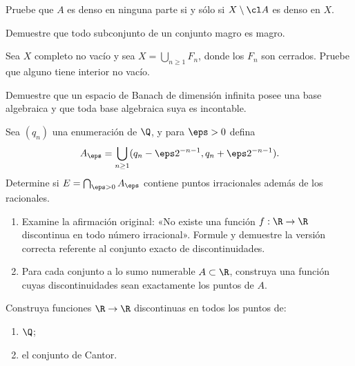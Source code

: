 \begin{ejercicio}\label{ej:lectura-10-4}
Pruebe que $A$ es denso en ninguna parte si y sólo si $X\setminus\cl A$ es denso en $X$.
\end{ejercicio}


\begin{ejercicio}\label{ej:lectura-10-5}
Demuestre que todo subconjunto de un conjunto magro es magro.
\end{ejercicio}


\begin{ejercicio}\label{ej:lectura-10-6}
Sea $X$ completo no vacío y sea $X=\bigcup_{n\geq1}F_n$, donde los $F_n$ son cerrados. Pruebe que alguno tiene interior no vacío.
\end{ejercicio}


\begin{ejercicio}\label{ej:lectura-10-7}
Demuestre que un espacio de Banach de dimensión infinita posee una base algebraica y que toda base algebraica suya es incontable.
\end{ejercicio}


\begin{ejercicio}\label{ej:lectura-10-8}
Sea $(q_n)$ una enumeración de $\Q$, y para $\eps>0$ defina
\[
 A_\eps=\bigcup_{n\geq1}(q_n-\eps2^{-n-1},q_n+\eps2^{-n-1}).
\]
Determine si $E=\bigcap_{\eps>0}A_\eps$ contiene puntos irracionales además de los racionales.
\end{ejercicio}


\begin{ejercicio}\label{ej:lectura-10-9}
\begin{enumerate}[label=(\roman*)]
\item Examine la afirmación original: «No existe una función $f:\R\to\R$ discontinua en todo número irracional». Formule y demuestre la versión correcta referente al conjunto exacto de discontinuidades.
\item Para cada conjunto a lo sumo numerable $A\subset\R$, construya una función cuyas discontinuidades sean exactamente los puntos de $A$.
\end{enumerate}
\end{ejercicio}


\begin{ejercicio}\label{ej:lectura-10-10}
Construya funciones $\R\to\R$ discontinuas en todos los puntos de: \begin{enumerate}[label=(\roman*)]\item $\Q$;\item el conjunto de Cantor.\end{enumerate}
\end{ejercicio}


